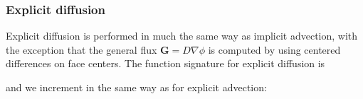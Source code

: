 \documentclass[letterpaper,10pt,english]{sphinxmanual}
\begin{document}
\begin{sphinxVerbatim}[commandchars=\\\{\},formatcom=\scriptsize]
 

    

         
    
          
                 
\end{sphinxVerbatim}


\subsubsection{Explicit diffusion}
\label{\detokenize{Solvers/CDR:explicit-diffusion}}\label{\detokenize{Solvers/CDR:chap-explicitdiffusion}}
Explicit diffusion is performed in much the same way as implicit advection, with the exception that the general flux \(\mathbf{G} = D\nabla\phi\) is computed by using centered differences on face centers.
The function signature for explicit diffusion is

\begin{sphinxVerbatim}[commandchars=\\\{\},formatcom=\scriptsize]
     
\end{sphinxVerbatim}

and we increment in the same way as for explicit advection:
\end{document}
